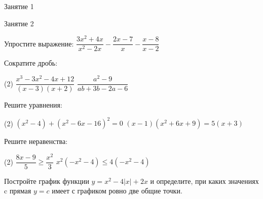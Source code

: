 %

\begin{class}[number=1]
	
	\begin{listofex}
		\item   Занятие 1
	\end{listofex}
\end{class}

\begin{class}[number=2]
	\begin{listofex}
		\item Занятие 2
	\end{listofex}
\end{class}

\begin{homework}[number=1]
	\begin{listofex}
		\item Упростите выражение: \( \dfrac{3x^2+4x}{x^2-2x}-\dfrac{2x-7}{x}-\dfrac{x-8}{x-2} \)
		\item Сократите дробь: 
		\begin{tasks}(2)
			\task \(\dfrac{x^3-3x^2-4x+12}{(x-3)(x+2)}\)
			\task \( \dfrac{a^2-9}{ab+3b-2a-6} \)
		\end{tasks}
		\item Решите уравнения: 
		\begin{tasks}(2)
			\task \((x^2-4)+(x^2-6x-16)^2=0\)
			\task \( (x-1)(x^2+6x+9)=5(x+3) \)
		\end{tasks}
		\item Решите неравенства: 
		\begin{tasks}(2)
			\task \( \dfrac{8x-9}{5} \geq \dfrac{x^2}{3} \)
			\task \( x^2(-x^2-4) \leq 4(-x^2-4) \)
		\end{tasks}
		\item Постройте график функции \(y=x^2-4|x|+2x\) и определите, при каких значениях c прямая \(y=c\) имеет с графиком ровно две общие точки.
	\end{listofex}
\end{homework}


